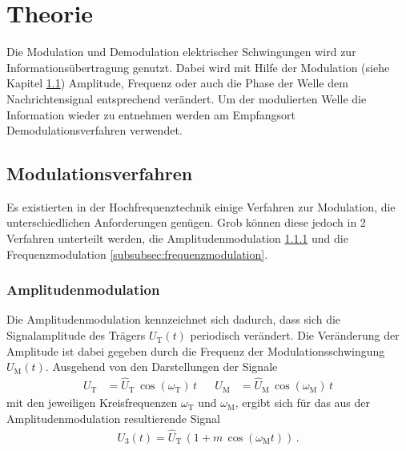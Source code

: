 \section{Theorie}
\label{sec:Theorie}
Die Modulation und Demodulation
elektrischer Schwingungen wird
zur Informationsübertragung genutzt.
Dabei wird mit Hilfe der Modulation
(siehe Kapitel \ref{subsec:modulationsverfahren})
Amplitude, Frequenz oder auch die Phase
der Welle dem Nachrichtensignal entsprechend
verändert.
Um der modulierten Welle die Information
wieder zu entnehmen werden am Empfangsort
Demodulationsverfahren verwendet.

\subsection{Modulationsverfahren}
\label{subsec:modulationsverfahren}
Es existierten in der Hochfrequenztechnik einige
Verfahren zur Modulation, die unterschiedlichen
Anforderungen genügen. Grob können diese
jedoch in 2 Verfahren unterteilt
werden, die Amplitudenmodulation \ref{subsubsec:amplitudenmodulation}
und die Frequenzmodulation \ref{subsubsec:frequenzmodulation}.

\subsubsection{Amplitudenmodulation}
\label{subsubsec:amplitudenmodulation}
Die Amplitudenmodulation kennzeichnet sich
dadurch, dass sich die Signalamplitude
des Trägers $U_{\text{T}}(t)$ periodisch verändert.
Die Veränderung der Amplitude ist dabei gegeben
durch die Frequenz der Modulationsschwingung
$U_{\text{M}}(t)$.
Ausgehend von den Darstellungen der Signale
\begin{align}
U_{\text{T}} &= \hat{U}_{\text{T}} \, \cos (\omega_{\text{T}}) \, t& &
U_{\text{M}} &= \hat{U}_{\text{M}} \, \cos (\omega_{\text{M}}) \, t
\end{align}
mit den jeweiligen Kreisfrequenzen $\omega_{\text{T}}$ und $\omega_{\text{M}}$,
ergibt sich für das aus der Amplitudenmodulation resultierende Signal
\begin{align}
\label{eqn:1}
U_{3}(t) = \hat{U}_{\text{T}} \, \left( 1 + m \, \cos(\omega_{\text{M}} t) \right) \, .
\end{align}

